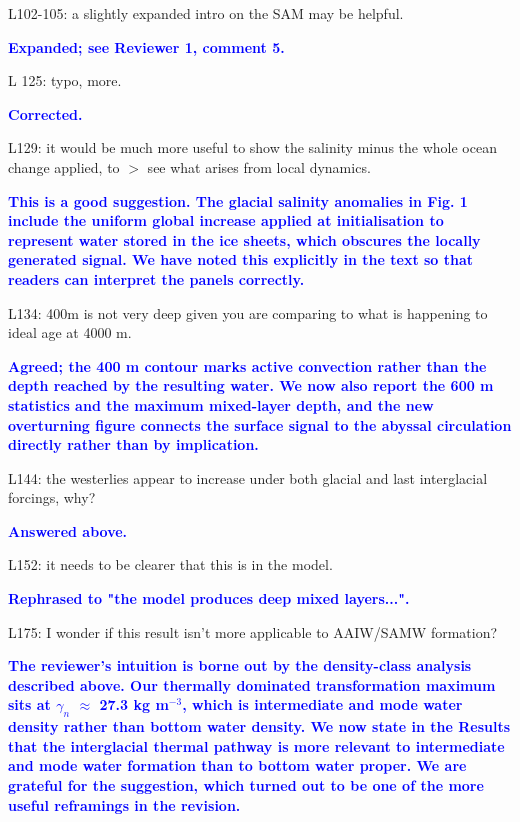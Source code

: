 \documentclass[pdflatex,sn-nature]{sn-jnl}
\begin{document}
\medskip
\noindent L102-105: a slightly expanded intro on the SAM may be helpful.
\medskip

\noindent\textcolor{blue}{\textbf{Expanded; see Reviewer 1, comment 5.}}


\medskip
\noindent L 125: typo, more.
\medskip

\noindent\textcolor{blue}{\textbf{Corrected.}}


\medskip
\noindent L129: it would be much more useful to show the salinity minus the whole ocean change applied, to $>$ see what arises from local dynamics.
\medskip

\noindent\textcolor{blue}{\textbf{This is a good suggestion. The glacial salinity anomalies in Fig. 1 include the uniform global increase applied at initialisation to represent water stored in the ice sheets, which obscures the locally generated signal. We have noted this explicitly in the text so that readers can interpret the panels correctly.}}


\medskip
\noindent L134: 400m is not very deep given you are comparing to what is happening to ideal age at 4000 m.
\medskip

\noindent\textcolor{blue}{\textbf{Agreed; the 400 m contour marks active convection rather than the depth reached by the resulting water. We now also report the 600 m statistics and the maximum mixed-layer depth, and the new overturning figure connects the surface signal to the abyssal circulation directly rather than by implication.}}


\medskip
\noindent L144: the westerlies appear to increase under both glacial and last interglacial forcings, why?
\medskip

\noindent\textcolor{blue}{\textbf{Answered above.}}


\medskip
\noindent L152: it needs to be clearer that this is in the model.
\medskip

\noindent\textcolor{blue}{\textbf{Rephrased to "the model produces deep mixed layers...".}}


\medskip
\noindent L175: I wonder if this result isn't more applicable to AAIW/SAMW formation?
\medskip

\noindent\textcolor{blue}{\textbf{The reviewer's intuition is borne out by the density-class analysis described above. Our thermally dominated transformation maximum sits at $\gamma_n$ $\approx$ 27.3 kg m$^{-3}$, which is intermediate and mode water density rather than bottom water density. We now state in the Results that the interglacial thermal pathway is more relevant to intermediate and mode water formation than to bottom water proper. We are grateful for the suggestion, which turned out to be one of the more useful reframings in the revision.}}
\end{document}
